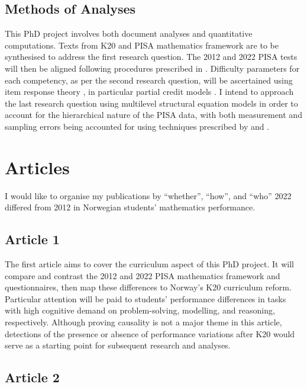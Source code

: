 \documentclass[
    a4paper,                %
    11pt,                   %
    stu,                    %
    donotrepeattitle,       %
    floatsintext,           %
    biblatex,               %
    colorlinks=true,        %
    linkcolor=red,          %
    anchorcolor=black,      %
    citecolor=blue,         %
    urlcolor=blue,          %
    bookmarks=true,         %
    bookmarksopen=false,    %
    bookmarksnumbered=true, %
    dvipsnames              %
]{apa7}
\begin{document}
\subsection{Methods of Analyses}

This PhD project involves both document analyses and quantitative computations. Texts from K20 \parencite{udir:2020} and PISA mathematics framework \parencite{oecd:2013,oecd:2018} are to be synthesised to address the first research question. The 2012 and 2022 PISA tests will then be aligned following procedures prescribed in \textcite{kolen:2014}. Difficulty parameters for each competency, as per the second research question, will be ascertained using item response theory \parencite{deayala:2022}, in particular partial credit models \parencite{masters:1982}. I intend to approach the last research question using multilevel structural equation models in order to account for the hierarchical nature of the PISA data, with both measurement and sampling errors being accounted for using techniques prescribed by \textcite{ludtke:2008} and \textcite{marsh:2009}.

\section{Articles}

I would like to organise my publications by ``whether'', ``how'', and ``who'' 2022 differed from 2012 in Norwegian students' mathematics performance.

\subsection{Article 1}

The first article aims to cover the curriculum aspect of this PhD project. It will compare and contrast the 2012 and 2022 PISA mathematics framework and questionnaires, then map these differences to Norway's K20 curriculum reform. Particular attention will be paid to students' performance differences in tasks with high cognitive demand on problem-solving, modelling, and reasoning, respectively. Although proving causality is not a major theme in this article, detections of the presence or absence of performance variations after K20 would serve as a starting point for subsequent research and analyses.

\subsection{Article 2}
\end{document}
